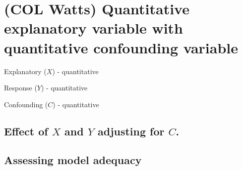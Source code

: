 \documentclass[
]{book}
\begin{document}
\vspace{1in}

\hypertarget{quantitative}{%
\chapter{(COL Watts) Quantitative explanatory variable with quantitative confounding variable}\label{quantitative}}

Explanatory (\(X\)) - quantitative

Response (\(Y\)) - quantitative

Confounding (\(C\)) - quantitative

\hypertarget{effect-of-x-and-y-adjusting-for-c.-1}{%
\section{\texorpdfstring{Effect of \(X\) and \(Y\) adjusting for \(C\).}{Effect of X and Y adjusting for C.}}\label{effect-of-x-and-y-adjusting-for-c.-1}}

\hypertarget{assessing-model-adequacy-1}{%
\section{Assessing model adequacy}\label{assessing-model-adequacy-1}}

  
\end{document}
